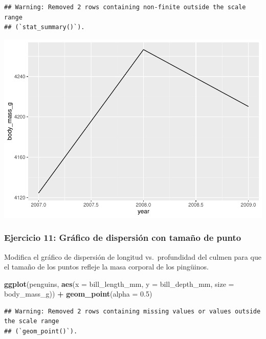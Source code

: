 \documentclass[
]{book}
\newenvironment{Shaded}{\begin{snugshade}}{\end{snugshade}}
\newcommand{\AttributeTok}[1]{\textcolor[rgb]{0.13,0.29,0.53}{#1}}
\newcommand{\FloatTok}[1]{\textcolor[rgb]{0.00,0.00,0.81}{#1}}
\newcommand{\FunctionTok}[1]{\textcolor[rgb]{0.13,0.29,0.53}{\textbf{#1}}}
\newcommand{\NormalTok}[1]{#1}
\newcommand{\SpecialCharTok}[1]{\textcolor[rgb]{0.81,0.36,0.00}{\textbf{#1}}}
\begin{document}
\begin{verbatim}
## Warning: Removed 2 rows containing non-finite outside the scale range
## (`stat_summary()`).
\end{verbatim}

\includegraphics{bookdown-demo_files/figure-latex/unnamed-chunk-192-1.pdf}

\subsubsection{Ejercicio 11: Gráfico de dispersión con tamaño de punto}\label{ejercicio-11-gruxe1fico-de-dispersiuxf3n-con-tamauxf1o-de-punto}

Modifica el gráfico de dispersión de longitud vs.~profundidad del culmen para que el tamaño de los puntos refleje la masa corporal de los pingüinos.

\begin{Shaded}
\begin{Highlighting}[]
\FunctionTok{ggplot}\NormalTok{(penguins, }\FunctionTok{aes}\NormalTok{(}\AttributeTok{x =}\NormalTok{ bill\_length\_mm, }\AttributeTok{y =}\NormalTok{ bill\_depth\_mm, }\AttributeTok{size =}\NormalTok{ body\_mass\_g)) }\SpecialCharTok{+}
  \FunctionTok{geom\_point}\NormalTok{(}\AttributeTok{alpha =} \FloatTok{0.5}\NormalTok{)}
\end{Highlighting}
\end{Shaded}

\begin{verbatim}
## Warning: Removed 2 rows containing missing values or values outside the scale range
## (`geom_point()`).
\end{verbatim}
\end{document}
